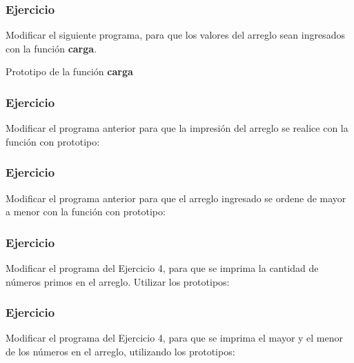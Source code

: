 {\scriptsize
  \lstset{inputencoding=utf8/latin1}
  
}

\subsubsection{Ejercicio}
Modificar el siguiente programa, para que los valores del arreglo sean ingresados con la función \textbf{carga}.
\lstset{inputencoding=utf8/latin1}

Prototipo de la función \textbf{carga}
\lstset{inputencoding=utf8/latin1}


\subsubsection{Ejercicio}
Modificar el programa anterior para que la impresión del arreglo se realice con la función con prototipo:
\lstset{inputencoding=utf8/latin1}


\subsubsection{Ejercicio}
Modificar el programa anterior para que el arreglo ingresado se ordene de mayor a menor con la función con prototipo:
\lstset{inputencoding=utf8/latin1}


\subsubsection{Ejercicio}
Modificar el programa del Ejercicio 4, para que se imprima la cantidad de números primos en el arreglo. Utilizar los prototipos:
\lstset{inputencoding=utf8/latin1}


\subsubsection{Ejercicio}
Modificar el programa del Ejercicio 4, para que se imprima el mayor y el menor de los números en el arreglo, utilizando los prototipos:
\lstset{inputencoding=utf8/latin1}



